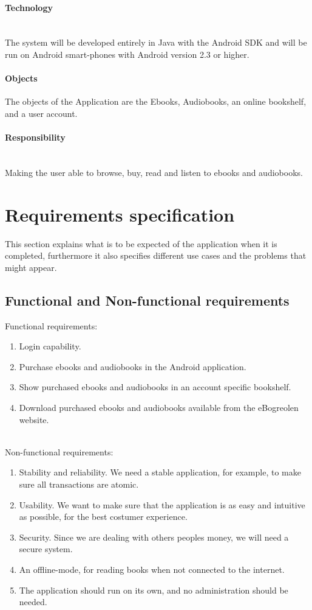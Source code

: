 \documentclass[12pt]{article}
\begin{document}
\paragraph{Technology}$ $\\
The system will be developed entirely in Java with the Android SDK and will be run on Android smart-phones with Android version 2.3 or higher.

\paragraph{Objects}
The objects of the Application are the Ebooks, Audiobooks, an online bookshelf, and a user account.

\paragraph{Responsibility}$ $\\
Making the user able to browse, buy, read and listen to ebooks and audiobooks.
\section{Requirements specification}
This section explains what is to be expected of the application when it is completed, furthermore it also specifies different use cases and the problems that might appear.
\subsection{Functional and Non-functional requirements}

Functional requirements:
\begin{enumerate}
\item Login capability.
\item Purchase ebooks and audiobooks in the Android application.
\item Show purchased ebooks and audiobooks in an account specific bookshelf.
\item Download purchased ebooks and audiobooks available from the eBogreolen website.
\end{enumerate}
$ $\\
Non-functional requirements:
\begin{enumerate}
\item Stability and reliability. We need a stable application, for example, to make sure all transactions are atomic.
\item Usability. We want to make sure that the application is as easy and intuitive as possible, for the best costumer experience.
\item Security. Since we are dealing with others peoples money, we will need a secure system.
\item An offline-mode, for reading books when not connected to the internet.
\item The application should run on its own, and no administration should be needed.
\end{enumerate}
\end{document}
